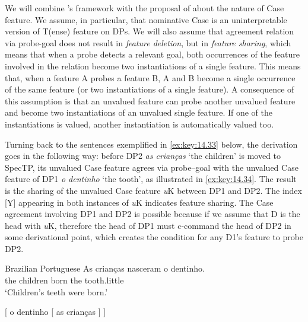 \documentclass[output=paper]{langsci/langscibook}
\begin{document}
We will combine \citet{Chomsky2008}’s framework with the proposal of
\citet{PesTor2004} about the nature of Case feature. We assume, in
particular, that nominative Case is an uninterpretable version of T(ense)
feature on DPs. We will also assume that agreement relation via probe-goal does
not result in \emph{feature deletion}, but in \emph{feature sharing}, which
means that when a probe detects a relevant goal, both occurrences of the
feature involved in the relation become two instantiations of a single feature.
This means that, when a feature A probes a feature B, A and B become a single
occurrence of the same feature (or two instantiations of a single feature). A
consequence of this assumption is that an unvalued feature can probe another
unvalued feature and become two instantiations of an unvalued single feature.
If one of the instantiations is valued, another instantiation is automatically
valued too.

Turning back to the sentences exemplified in \eqref{ex:key:14.33} below, the
derivation goes in the following way: before DP2 \emph{as crianças} ‘the
children’ is moved to SpecTP, its unvalued Case feature agrees via probe--goal
with the unvalued Case feature of DP1 \emph{o dentinho} ‘the tooth’, as
illustrated in \eqref{ex:key:14.34}. The result is the sharing of the unvalued Case
feature \emph{u}K between DP1 and DP2. The index [Y] appearing in both
instances of \emph{u}K indicates feature sharing. The Case agreement
involving DP1 and DP2 is possible because if we assume that D is the head with
\emph{u}K, therefore the head of DP1 must c-command the head of DP2 in some
derivational point, which creates the condition for any D1’s feature to probe
DP2.\largerpage[1]

\ea%
    \label{ex:key:14.33}Brazilian Portuguese
    \sn
    \gll    As crianças nasceram o dentinho.\\
            the children born the tooth.little\\
    \glt    ‘Children’s teeth were born.’
\z

\ea%
    \label{ex:key:14.34}
    {}[ o dentinho [ as crianças ] ]
\z
\end{document}
